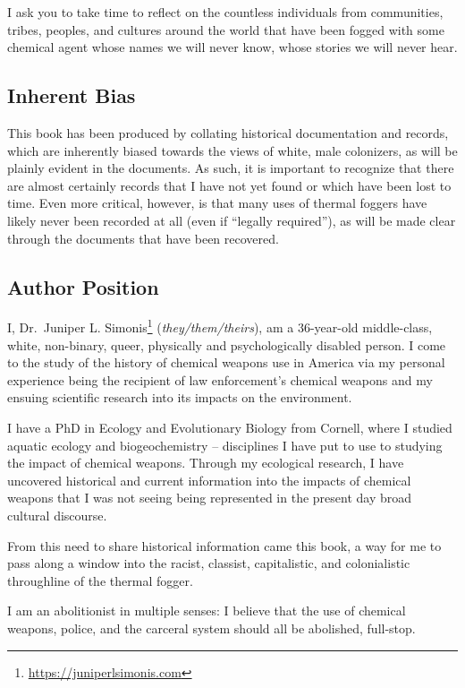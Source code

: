 \documentclass[
  11pt,
]{krantz}
\renewcommand{\href}[2]{#2\footnote{\url{#1}}}
\begin{document}
I ask you to take time to reflect on the countless individuals from communities, tribes, peoples, and cultures around the world that have been fogged with some chemical agent whose names we will never know, whose stories we will never hear.

\hypertarget{inherent-bias}{%
\subsection*{Inherent Bias}\label{inherent-bias}}


This book has been produced by collating historical documentation and records, which are inherently biased towards the views of white, male colonizers, as will be plainly evident in the documents.
As such, it is important to recognize that there are almost certainly records that I have not yet found or which have been lost to time.
Even more critical, however, is that many uses of thermal foggers have likely never been recorded at all (even if ``legally required''), as will be made clear through the documents that have been recovered.

\hypertarget{author-position}{%
\subsection*{Author Position}\label{author-position}}


I, \href{https://juniperlsimonis.com}{Dr.~Juniper L. Simonis} (\emph{they/them/theirs}), am a 36-year-old middle-class, white, non-binary, queer, physically and psychologically disabled person.
I come to the study of the history of chemical weapons use in America via my personal experience being the recipient of law enforcement's chemical weapons and my ensuing scientific research into its impacts on the environment.

I have a PhD in Ecology and Evolutionary Biology from Cornell, where I studied aquatic ecology and biogeochemistry -- disciplines I have put to use to studying the impact of chemical weapons.
Through my ecological research, I have uncovered historical and current information into the impacts of chemical weapons that I was not seeing being represented in the present day broad cultural discourse.

From this need to share historical information came this book, a way for me to pass along a window into the racist, classist, capitalistic, and colonialistic throughline of the thermal fogger.

I am an abolitionist in multiple senses: I believe that the use of chemical weapons, police, and the carceral system should all be abolished, full-stop.
\end{document}
